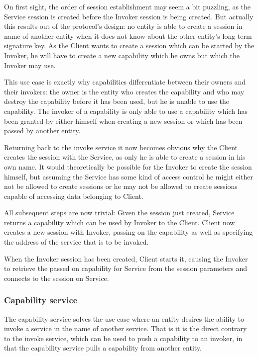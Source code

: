 On first sight, the order of session establishment may seem a bit puzzling, as the Service session is created before the Invoker session is being created.
But actually this results out of the protocol's design: no entity is able to create a session in name of another entity when it does not know about the other entity's long term signature key.
As the Client wants to create a session which can be started by the Invoker, he will have to create a new capability which he owns but which the Invoker may use.

This use case is exactly why capabilities differentiate between their owners and their invokers:
the owner is the entity who creates the capability and who may destroy the capability before it has been used, but he is unable to use the capability.
The invoker of a capability is only able to use a capability which has been granted by either himself when creating a new session or which has been passed by another entity.

Returning back to the invoke service it now becomes obvious why the Client creates the session with the Service, as only he is able to create a session in his own name.
It would theoretically be possible for the Invoker to create the session himself, but assuming the Service has some kind of access control he might either not be allowed to create sessions or he may not be allowed to create sessions capable of accessing data belonging to Client.

All subsequent steps are now trivial:
Given the session just created, Service returns a capability which can be used by Invoker to the Client.
Client now creates a new session with Invoker, passing on the capability as well as specifying the address of the service that is to be invoked.

When the Invoker session has been created, Client starts it, causing the Invoker to retrieve the passed on capability for Service from the session parameters and connects to the session on Service.

\subsubsection{Capability service}
\label{sec:capability-service}

The capability service solves the use case where an entity desires the ability to invoke a service in the name of another service.
That is it is the direct contrary to the invoke service, which can be used to push a capability to an invoker, in that the capability service pulls a capability from another entity.


